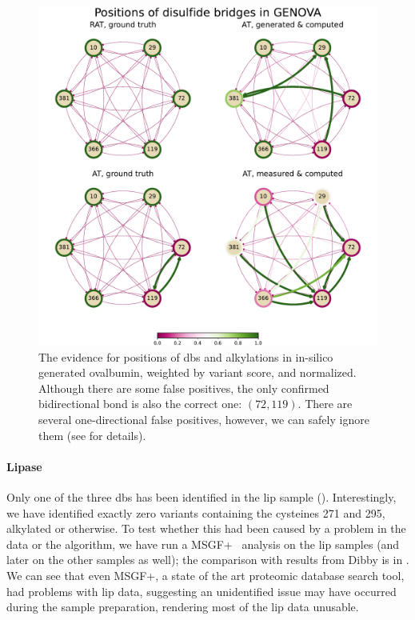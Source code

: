 \begin{figure}
  \centering
  \includegraphics[width=0.9\linewidth]{img/genova.pdf}
  \caption{The evidence for positions of \glspl*{db} and alkylations in in-silico generated ovalbumin, weighted by variant score, and normalized. Although there are some false positives, the only confirmed bidirectional bond is also the correct one: \((72, 119)\). There are several one-directional false positives, however, we can safely ignore them (see  for details).}\label{fig:genova}
\end{figure}

\paragraph{Lipase} Only one of the three \glspl*{db} has been identified in the \gls*{lip} sample (). Interestingly, we have identified exactly zero variants containing the cysteines 271 and 295, alkylated or otherwise. To test whether this had been caused by a problem in the data or the algorithm, we have run a MSGF+~\cite{kim2014ms} analysis on the \gls*{lip} samples (and later on the other samples as well); the comparison with results from Dibby is in . We can see that even MSGF+, a state of the art proteomic database search tool, had problems with \gls*{lip} data, suggesting an unidentified issue may have occurred during the sample preparation, rendering most of the \gls*{lip} data unusable.

